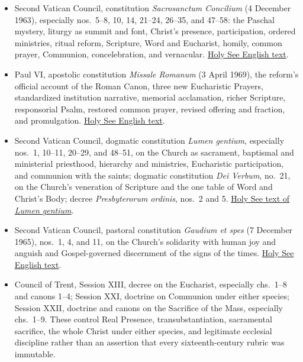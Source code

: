 \begin{itemize}
  \item Second Vatican Council, constitution \emph{Sacrosanctum Concilium} (4 December 1963), especially nos.~5--8, 10, 14, 21--24, 26--35, and 47--58: the Paschal mystery, liturgy as summit and font, Christ's presence, participation, ordered ministries, ritual reform, Scripture, Word and Eucharist, homily, common prayer, Communion, concelebration, and vernacular. \href{https://www.vatican.va/archive/hist_councils/ii_vatican_council/documents/vat-ii_const_19631204_sacrosanctum-concilium_en.html}{Holy See English text}.
  \item Paul VI, apostolic constitution \emph{Missale Romanum} (3 April 1969), the reform's official account of the Roman Canon, three new Eucharistic Prayers, standardized institution narrative, memorial acclamation, richer Scripture, responsorial Psalm, restored common prayer, revised offering and fraction, and promulgation. \href{https://www.vatican.va/content/paul-vi/en/apost_constitutions/documents/hf_p-vi_apc_19690403_missale-romanum.html}{Holy See English text}.
  \item Second Vatican Council, dogmatic constitution \emph{Lumen gentium}, especially nos.~1, 10--11, 20--29, and 48--51, on the Church as sacrament, baptismal and ministerial priesthood, hierarchy and ministries, Eucharistic participation, and communion with the saints; dogmatic constitution \emph{Dei Verbum}, no.~21, on the Church's veneration of Scripture and the one table of Word and Christ's Body; decree \emph{Presbyterorum ordinis}, nos.~2 and 5. \href{https://www.vatican.va/archive/hist_councils/ii_vatican_council/documents/vat-ii_const_19641121_lumen-gentium_en.html}{Holy See text of \emph{Lumen gentium}}.
  \item Second Vatican Council, pastoral constitution \emph{Gaudium et spes} (7 December 1965), nos.~1, 4, and 11, on the Church's solidarity with human joy and anguish and Gospel-governed discernment of the signs of the times. \href{https://www.vatican.va/archive/hist_councils/ii_vatican_council/documents/vat-ii_const_19651207_gaudium-et-spes_en.html}{Holy See English text}.
  \item Council of Trent, Session XIII, decree on the Eucharist, especially chs.~1--8 and canons 1--4; Session XXI, doctrine on Communion under either species; Session XXII, doctrine and canons on the Sacrifice of the Mass, especially chs.~1--9. These control Real Presence, transubstantiation, sacramental sacrifice, the whole Christ under either species, and legitimate ecclesial discipline rather than an assertion that every sixteenth-century rubric was immutable.

\end{itemize}

